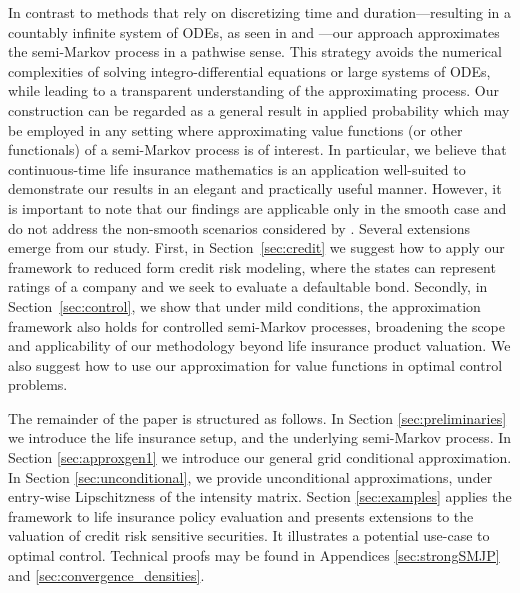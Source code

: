 \documentclass[11pt,leqno]{amsart}
\numberwithin{table}{section}
\numberwithin{figure}{section}
\numberwithin{equation}{section}
\newcommand{\1}{{\mathds{1}}}
\newcommand{\0}{\mat{0}}
\begin{document}
{ In contrast to methods that rely on discretizing time and duration---resulting in a countably infinite system of ODEs, as seen in \cite{buchardt2015cash} and \cite{adekambi2017integral}---our approach approximates the semi-Markov process in a pathwise sense. This strategy avoids the numerical complexities of solving integro-differential equations or large systems of ODEs, while leading to a  transparent understanding of the approximating process. %
} Our construction can be regarded as a general result in applied probability which may be employed in any setting where approximating value functions (or other functionals) of a semi-Markov process is of interest. In particular, we believe that continuous-time life insurance mathematics is an application well-suited to demonstrate our results in an elegant and practically useful manner. { However, it is important to note that our findings are applicable only in the smooth case and do not address the non-smooth scenarios considered by \cite{helwich2008durational}}. Several extensions emerge from our study. First, in Section~\ref{sec:credit} we suggest how to apply our framework to reduced form credit risk modeling, where the states can represent ratings of a company and we seek to evaluate a defaultable bond. Secondly, in Section~\ref{sec:control}, we show that under mild conditions, the approximation framework also holds for controlled semi-Markov processes, broadening the scope and applicability of our methodology beyond life insurance product valuation. We also suggest how to use our approximation for value functions in optimal control problems.



The remainder of the paper is structured as follows. In Section \ref{sec:preliminaries} we introduce the life insurance setup, and the underlying semi-Markov process.
In Section \ref{sec:approxgen1} we introduce our general grid conditional approximation. In Section \ref{sec:unconditional}, we provide unconditional approximations, under entry-wise Lipschitzness of the intensity matrix.
Section \ref{sec:examples} applies the framework to life insurance policy evaluation and presents extensions to the valuation of credit risk sensitive securities. It illustrates a potential use-case to optimal control. Technical proofs may be found in Appendices \ref{sec:strongSMJP} and \ref{sec:convergence_densities}.
\end{document}

